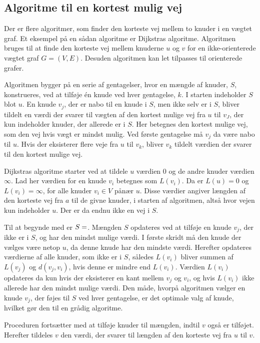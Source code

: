 \subsection{Algoritme til en kortest mulig vej}
Der er flere algoritmer, som finder den korteste vej mellem to knuder i en vægtet graf.
Et eksempel på en sådan algoritme er Dijkstras algoritme.
Algoritmen bruges til at finde den korteste vej mellem knuderne $u$ og $v$ for en ikke-orienterede vægtet graf $G=(V,E)$. Desuden algoritmen kan let tilpasses til orienterede grafer.

Algoritmen bygger på en serie af gentagelser, hvor en mængde af knuder, $S$, konstrueres, ved at tilføje én knude ved hver gentagelse, $k$.
I starten indeholder $S$ blot $u$.
En knude $v_j$, der er nabo til en knude i $S$, men ikke selv er i $S$, bliver tildelt en værdi der svarer til vægten af den kortest mulige vej fra $u$ til $v_J$, der kun indeholder knuder, der allerede er i $S$.
Her betegnes den kortest mulige vej, som den vej hvis vægt er mindst mulig. 
Ved første gentagelse må $v_j$ da være nabo til $u$.
Hvis der eksisterer flere veje fra $u$ til $v_k$, bliver $v_k$ tildelt værdien der svarer til den kortest mulige vej. 

Dijkstras algoritme starter ved at tildele $u$ værdien $0$ og de andre knuder værdien $\infty$. 
Lad her værdien for en knude $v_i$ betegnes som $L(v_i)$.
Da er $L(u) = 0$ og $L(v_i)= \infty$, for alle knuder $v_i \in V$ pånær $u$.
Disse værdier angiver længden af den korteste vej fra $a$ til de givne knuder, i starten af algoritmen, altså hvor vejen kun indeholder $u$. 
Der er da endnu ikke en vej i $S$.

Til at begynde med er $S=\empty $. 
Mængden $S$ opdateres ved at tilføje en knude $v_j$, der ikke er i $S$, og har den mindst mulige værdi.
I første skridt må den knude der vælges være netop $u$, da denne knude har den mindste værdi.
Herefter opdateres værdierne af alle knuder, som ikke er i $S$, således $L(v_i)$ bliver summen af $L(v_j)$ og $d(v_j,v_i)$, hvis denne er mindre end $L(v_i)$.
Værdien $L(v_i)$ opdateres da kun hvis der eksisterer en kant mellem $v_j$ og $v_i$, og hvis $L(v_i)$ ikke allerede har den mindst mulige værdi. 
Den måde, hvorpå algoritmen vælger en knude $v_j$, der føjes til $S$ ved hver gentagelse, er det optimale valg af knude, hvilket gør den til en grådig algoritme. 

Proceduren fortsætter med at tilføje knuder til mængden, indtil $v$ også er tilføjet.
Herefter tildeles $v$ den værdi, der svarer til længden af den korteste vej fra $u$ til $v$.

